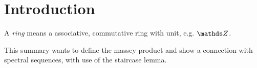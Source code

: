 \section*{Introduction}

A \textit{ring} means a associative, commutative ring with unit, e.g. $ \Z $.


This summary wants to define the massey product and
show a connection with spectral sequences, with use
of the staircase lemma.

